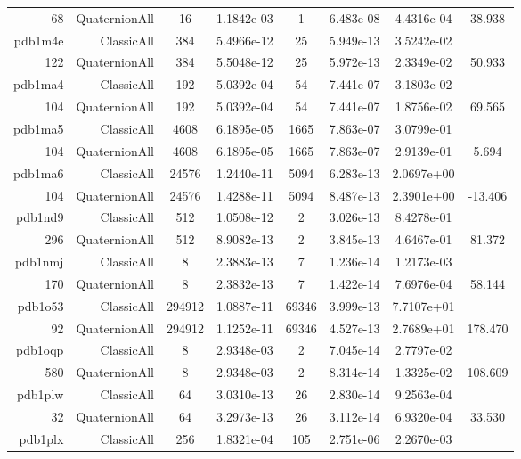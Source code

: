 \begin{xltabular}{\textwidth}{r|rcS[table-format=1.4e+2]cS[table-format=1.3e+2]S[table-format=1.4e+2]S[table-format=-1.3]}
68 & QuaternionAll & 16 & 1.1842e-03 & 1 & 6.483e-08 & 4.4316e-04 & 38.938\\  \addlinespace
pdb1m4e & ClassicAll & 384 & 5.4966e-12 & 25 & 5.949e-13 & 3.5242e-02 & \\
122 & QuaternionAll & 384 & 5.5048e-12 & 25 & 5.972e-13 & 2.3349e-02 & 50.933\\  \addlinespace
pdb1ma4 & ClassicAll & 192 & 5.0392e-04 & 54 & 7.441e-07 & 3.1803e-02 & \\
104 & QuaternionAll & 192 & 5.0392e-04 & 54 & 7.441e-07 & 1.8756e-02 & 69.565\\  \addlinespace
pdb1ma5 & ClassicAll & 4608 & 6.1895e-05 & 1665 & 7.863e-07 & 3.0799e-01 & \\
104 & QuaternionAll & 4608 & 6.1895e-05 & 1665 & 7.863e-07 & 2.9139e-01 & 5.694\\  \addlinespace
pdb1ma6 & ClassicAll & 24576 & 1.2440e-11 & 5094 & 6.283e-13 & 2.0697e+00 & \\
104 & QuaternionAll & 24576 & 1.4288e-11 & 5094 & 8.487e-13 & 2.3901e+00 & -13.406\\  \addlinespace
pdb1nd9 & ClassicAll & 512 & 1.0508e-12 & 2 & 3.026e-13 & 8.4278e-01 & \\
296 & QuaternionAll & 512 & 8.9082e-13 & 2 & 3.845e-13 & 4.6467e-01 & 81.372\\  \addlinespace
pdb1nmj & ClassicAll & 8 & 2.3883e-13 & 7 & 1.236e-14 & 1.2173e-03 & \\
170 & QuaternionAll & 8 & 2.3832e-13 & 7 & 1.422e-14 & 7.6976e-04 & 58.144\\  \addlinespace
pdb1o53 & ClassicAll & 294912 & 1.0887e-11 & 69346 & 3.999e-13 & 7.7107e+01 & \\
92 & QuaternionAll & 294912 & 1.1252e-11 & 69346 & 4.527e-13 & 2.7689e+01 & 178.470\\  \addlinespace
pdb1oqp & ClassicAll & 8 & 2.9348e-03 & 2 & 7.045e-14 & 2.7797e-02 & \\
580 & QuaternionAll & 8 & 2.9348e-03 & 2 & 8.314e-14 & 1.3325e-02 & 108.609\\  \addlinespace
pdb1plw & ClassicAll & 64 & 3.0310e-13 & 26 & 2.830e-14 & 9.2563e-04 & \\
32 & QuaternionAll & 64 & 3.2973e-13 & 26 & 3.112e-14 & 6.9320e-04 & 33.530\\  \addlinespace
pdb1plx & ClassicAll & 256 & 1.8321e-04 & 105 & 2.751e-06 & 2.2670e-03 & \\

\end{xltabular}
